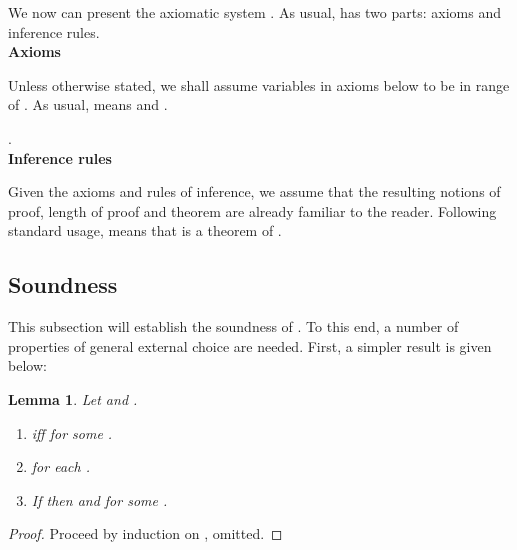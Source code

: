 \documentclass{elsarticle}
\theoremstyle{plain}
\newtheorem{lemma}[theorem]{Lemma}
\theoremstyle{definition}
\begin{document}
We now can present the axiomatic system . As usual,  has two parts: axioms and inference rules.\\

\noindent \textbf{Axioms}

 Unless otherwise stated, we shall assume variables in axioms below to be in range of . As usual,  means  and .\\

\noindent  
  
  
  
  
  
  
  
  
  
  
  \noindent 
   

   \noindent 
      

\noindent  
        

\noindent 
    
     
      
    .\\

\noindent \textbf{Inference rules}
    

Given the axioms and rules of inference, we assume that the resulting notions of proof, length of proof and theorem are already familiar to the reader. Following standard usage,  means that  is a theorem of .

\subsection{Soundness}
This subsection will establish the soundness of . To this end, a number of properties of general external choice  are needed. First, a simpler result is given below:

\begin{lemma}\label{L:BIG_SQUARE}
Let  and .
\begin{enumerate}
  \item  iff  for some .
  \item   for each .
  \item If  then  and  for some .
\end{enumerate}
\end{lemma}
\begin{proof}
  Proceed by induction on , omitted.
\end{proof}
\end{document}
